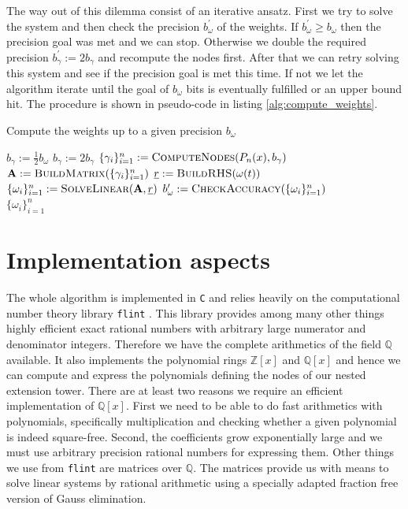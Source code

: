 \documentclass[a4paper,10pt]{article}
\begin{document}
The way out of this dilemma consist of an iterative ansatz. First we try to
solve the system and then check the precision $b_{\omega}^{\prime}$ of the
weights. If $b_{\omega}^{\prime} \geq b_{\omega}$ then the precision goal was
met and we can stop. Otherwise we double the required precision
$b_{\gamma}^{\prime} := 2 b_{\gamma}$ and recompute the nodes first. After
that we can retry solving this system and see if the precision goal is met
this time. If not we let the algorithm iterate until the goal of $b_{\omega}$ bits
is eventually fulfilled or an upper bound hit. The procedure is shown in pseudo-code
in listing \ref{alg:compute_weights}.

\begin{algorithm}
  \caption{Compute the weights up to a given precision $b_{\omega}$}
  \label{alg:compute_weights}
  \begin{algorithmic}
      \State $b_{\gamma} := \frac{1}{2} b_{\omega}$
      \Repeat
        \State $b_{\gamma} := 2 b_{\gamma}$
        \State $\{\gamma_i\}_{i=1}^{n} := \textsc{ComputeNodes}(P_n(x), b_{\gamma})$
        \State $\mat{A} := \textsc{BuildMatrix}(\{\gamma_i\}_{i=1}^{n})$
        \State $\vec{r} := \textsc{BuildRHS}(\omega(t))$
        \State $\{\omega_i\}_{i=1}^{n} := \textsc{SolveLinear}(\mat{A}, \vec{r})$
        \State $b^{\prime}_{\omega} := \textsc{CheckAccuracy}(\{\omega_i\}_{i=1}^{n})$
       \\
      \Return $\{\omega_i\}_{i=1}^{n}$
    \EndProcedure
  \end{algorithmic}
\end{algorithm}


\section{Implementation aspects}
\label{sec:implementation_aspects}

The whole algorithm is implemented in \texttt{C} and relies heavily
on the computational number theory library \texttt{flint} \cite{flint, Hart2010}.
This library provides among many other things highly efficient exact rational
numbers with arbitrary large numerator and denominator integers. Therefore we
have the complete arithmetics of the field $\mathbb{Q}$ available. It also
implements the polynomial rings $\mathbb{Z}[x]$ and $\mathbb{Q}[x]$ and hence we
can compute and express the polynomials defining the nodes of our nested extension
tower. There are at least two reasons we require an efficient implementation of
$\mathbb{Q}[x]$. First we need to be able to do fast arithmetics with polynomials,
specifically multiplication and checking whether a given polynomial is indeed square-free.
Second, the coefficients grow exponentially large and we must use arbitrary precision
rational numbers for expressing them. Other things we use from \texttt{flint} are
matrices over $\mathbb{Q}$. The matrices provide us with means to solve linear systems
by rational arithmetic using a specially adapted fraction free version of Gauss elimination.
\end{document}
